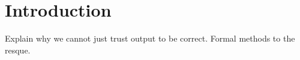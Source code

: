 \setcounter{section}{0}
\section{Introduction}\label{sec:introduction}



Explain why we cannot just trust output to be correct.
Formal methods to the resque.










